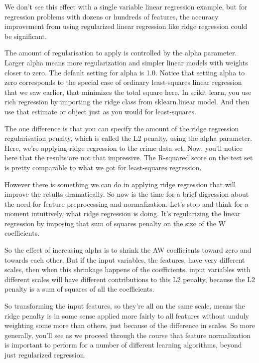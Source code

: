 \begin{multicols}{2}
We don't see this effect with a single variable linear regression example, but for regression problems with dozens or hundreds of features, the accuracy improvement from using regularized linear regression like ridge regression could be significant. 

The amount of regularisation to apply is controlled by the alpha parameter. Larger alpha means more regularization and simpler linear models with weights closer to zero. The default setting for alpha is 1.0. Notice that setting alpha to zero corresponds to the special case of ordinary least-squares linear regression that we saw earlier, that minimizes the total square here. In scikit learn, you use rich regression by importing the ridge class from sklearn.linear model. And then use that estimate or object just as you would for least-squares. 

The one difference is that you can specify the amount of the ridge regression regularisation penalty, which is called the L2 penalty, using the alpha parameter. Here, we're applying ridge regression to the crime data set. Now, you'll notice here that the results are not that impressive. The R-squared score on the test set is pretty comparable to what we got for least-squares regression. 

However there is something we can do in applying ridge regression that will improve the results dramatically. So now is the time for a brief digression about the need for feature preprocessing and normalization. Let's stop and think for a moment intuitively, what ridge regression is doing. It's regularizing the linear regression by imposing that sum of squares penalty on the size of the W coefficients. 

So the effect of increasing alpha is to shrink the AW coefficients toward zero and towards each other. But if the input variables, the features, have very different scales, then when this shrinkage happens of the coefficients, input variables with different scales will have different contributions to this L2 penalty, because the L2 penalty is a sum of squares of all the coefficients. 

So transforming the input features, so they're all on the same scale, means the ridge penalty is in some sense applied more fairly to all features without unduly weighting some more than others, just because of the difference in scales. So more generally, you'll see as we proceed through the course that feature normalization is important to perform for a number of different learning algorithms, beyond just regularized regression. 


\end{multicols}
